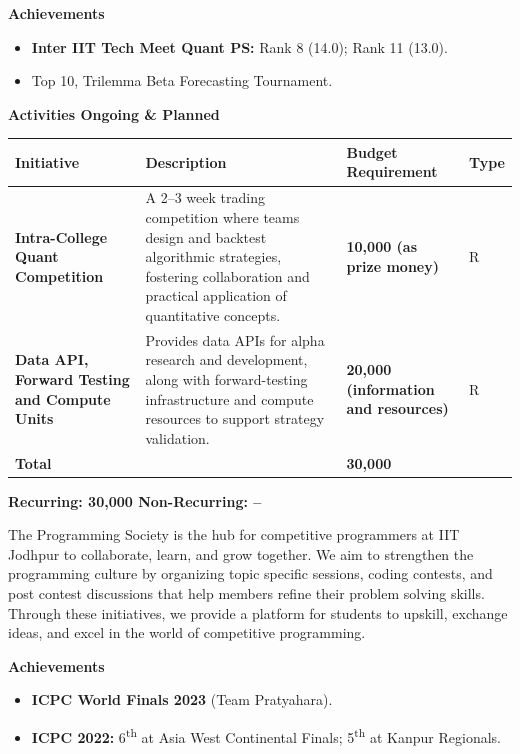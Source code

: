 \documentclass[11pt,letterpaper]{article}
\newcommand{\rs}{{\rupee}}
\newcommand{\society}[1]{\par\bigskip{\sffamily\bfseries\large #1}\par}
\newcommand{\subhead}[1]{\par{\bfseries #1}\par}
\begin{document}
\subhead{Achievements}
\begin{itemize}
  \item \textbf{Inter IIT Tech Meet Quant PS:} Rank 8 (14.0); Rank 11 (13.0).
  \item Top 10, Trilemma Beta Forecasting Tournament.
\end{itemize}

\subhead{Activities Ongoing \& Planned}
\begin{longtable}{|C{0.25\textwidth}|C{0.40\textwidth}|C{0.17\textwidth}|C{0.06\textwidth}|}
\hline
\textbf{Initiative} & \textbf{Description} & \textbf{Budget Requirement} & \textbf{Type}\\ \hline
\textbf{Intra-College Quant Competition} & A 2--3 week trading competition where teams design and backtest algorithmic strategies, fostering collaboration and practical application of quantitative concepts. & \textbf{\rs10,000 (as prize money)} & R\\ \hline
\textbf{Data API, Forward Testing and Compute Units} & Provides data APIs for alpha research and development, along with forward-testing infrastructure and compute resources to support strategy validation. & \textbf{\rs20,000 (information and resources)} & R\\ \hline
\textbf{Total} & & \textbf{\rs30,000} & \\ \hline
\end{longtable}

\textbf{Recurring: \rs30,000 \quad Non-Recurring: --}

\clearpage
\society{7.\ \ PSOC}

The Programming Society is the hub for competitive programmers at IIT Jodhpur to collaborate, learn, and grow together. We aim to strengthen the programming culture by organizing topic specific sessions, coding contests, and post contest discussions that help members refine their problem solving skills. Through these initiatives, we provide a platform for students to upskill, exchange ideas, and excel in the world of competitive programming.

\subhead{Achievements}
\begin{itemize}
  \item \textbf{ICPC World Finals 2023} (Team Pratyahara).
  \item \textbf{ICPC 2022:} 6\textsuperscript{th} at Asia West Continental Finals; 5\textsuperscript{th} at Kanpur Regionals.
\end{itemize}
\end{document}
